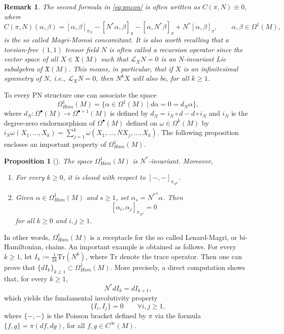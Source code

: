 \documentclass[12pt]{article}
\newtheorem{prop}[theorem]{Proposition}
\newtheorem{remark}[theorem]{Remark}
\begin{document}
\begin{remark}\label{rem:MMcon}
The second formula in 
\eqref{eq:pncon} is often written as $C(\pi,N)\equiv 0$, where 
\begin{equation}
C(\pi,N)(\alpha,\beta)=[\alpha,\beta]_{\pi_N}-[N^\ast\alpha,\beta]_{\pi}-[\alpha,N^\ast\beta]_{\pi}+N^\ast[\alpha,\beta]_{\pi},\qquad 
\alpha,\beta\in\Omega^1(M),\label{eq:MMconc}
\end{equation}
is the so called Magri-Morosi concomitant. It is also worth recalling that a torsion-free $(1,1)$ tensor field $N$ is often called a recursion operator since the vector space of all $X\in\mathfrak X(M)$ such that $\mathcal L_X N=0$ is an $N$-invariant Lie subalgebra of $\mathfrak X(M)$. This means, in particular, that if $X$ is an infinitesimal symmetry of $N$, i.e., 
$\mathcal L_XN=0$, then $N^kX$ will also be, for all $k\geq 1$.
\end{remark}
To every PN structure one can associate the space
\begin{equation}
\Omega^1_{Ham}(M)=\{\alpha\in\Omega^1(M)\mid d\alpha=0=d_N\alpha\},
\end{equation}
where $d_N:\Omega^\bullet(M)\rightarrow\Omega^{\bullet+1}(M)$ is defined by $d_N=i_N\circ d-d\circ i_N$ and $i_N$ is the degree-zero endormorphism of $\Omega^\bullet(M)$ defined on $\omega\in\Omega^k(M)$ by $i_N\omega(X_1,\dots,X_k)=\sum_{j=1}^k\omega(X_1,\dots,NX_j,\dots,X_k)$. The following proposition encloses an important property of $\Omega^1_{Ham}(M)$. 
\begin{prop}[\cite{Magri-Morosi,Bonechi}] The space $\Omega^1_{Ham}(M)$ is $N^\ast$-invariant. Moreover,
\begin{enumerate}
\item For every $k\geq 0$, it is closed with respect to $[-,-]_{\pi_{N^k}}$.
\item Given $\alpha\in\Omega^1_{Ham}(M)$ and $s\geq 1$, set $\alpha_s={N^\ast}^s\alpha$. Then 
\[
[\alpha_i,\alpha_j]_{\pi_{N^k}}=0
\] 
for all $k\geq 0$ and $i,j\geq 1$.
\end{enumerate}
\end{prop}
In other words, $\Omega^1_{Ham}(M)$ is a receptacle for the so called Lenard-Magri, or bi-Hamiltonian, chains.  
An important example is obtained as follows. For every $k\geq 1$, let $I_k:=\frac{1}{2k}\text{Tr}(N^k)$, where $\text{Tr}$ denote the trace operator. Then one can prove that $\{dI_k\}_{k\geq 1}\subset\Omega^1_{Ham}(M)$. More precisely, a direct computation shows that, for every $k\geq 1$, 
\begin{equation}
N^\ast dI_k=dI_{k+1},\label{eq:PNrec}
\end{equation}
which yields the fundamental involutivity property
\begin{equation}
\{I_i,I_j\}=0
\qquad\forall i,j\geq 1,\label{eq:invfam}
\end{equation}
where $\{-,-\}$ is the Poisson bracket defined by $\pi$ via the formula 
$\{f,g\}=\pi(df,dg)$, for all $f,g\in C^\infty(M)$.
\end{document}
